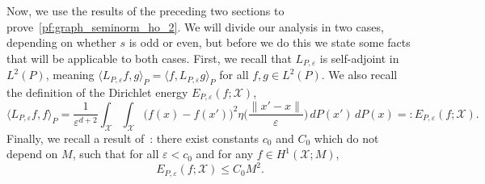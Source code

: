 \documentclass[aos]{imsart}
\theoremstyle{plain}
\theoremstyle{definition}
\theoremstyle{remark}
\newcommand{\dotp}[2]{\langle #1, #2 \rangle}
\newcommand{\mc}[1]{\mathcal{#1}}
\newcommand{\1}{\mathbf{1}}
\begin{document}
Now, we use the results of the preceding two sections to prove~\eqref{pf:graph_seminorm_ho_2}. We will divide our analysis in two cases, depending on whether $s$ is odd or even, but before we do this we state some facts that will be applicable to both cases. First, we  recall that $L_{P,\varepsilon}$ is self-adjoint in $L^2(P)$, meaning $\dotp{L_{P,\varepsilon}f}{g}_{P} = \dotp{f}{L_{P,\varepsilon}g}_{P}$ for all $f, g \in L^2(P)$. We also recall the definition of the Dirichlet energy $E_{P,\varepsilon}(f;\mc{X})$,
\begin{equation}
\label{eqn:dirichlet_energy}
\dotp{L_{P,\varepsilon}f}{f}_{P} = \frac{1}{\varepsilon^{d + 2}}\int_{\mc{X}} \int_{\mc{X}} \bigl(f(x) - f(x')\bigr)^2 \eta\biggl(\frac{\|x' - x\|}{\varepsilon}\biggr) \,dP(x') \,dP(x) =: E_{P,\varepsilon}(f;\mc{X}).
\end{equation}
Finally, we recall a result of~\cite{green2021}: there exist constants $c_0$ and $C_0$ which do not depend on $M$, such that for all $\varepsilon < c_0$ and for any $f \in H^1(\mc{X};M)$,
\begin{equation}
\label{pf:estimate_nonlocal_seminorm_1}
E_{P,\varepsilon}(f;\mc{X}) \leq C_0 M^2.
\end{equation}
\end{document}
